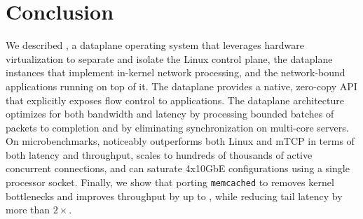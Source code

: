 
\section{Conclusion}

We described \ix, a dataplane operating system that leverages hardware
virtualization to separate and isolate the Linux control plane, the
\ix dataplane instances that implement in-kernel network processing,
and the network-bound applications running on top of it.  The \ix
dataplane provides a native, zero-copy API that explicitly exposes
flow control to applications. The dataplane architecture optimizes for
both bandwidth and latency by processing bounded batches of packets to
completion and by eliminating synchronization on multi-core
servers. On microbenchmarks, \ix noticeably outperforms both Linux and
mTCP in terms of both latency and throughput, scales to hundreds of
thousands of active concurrent connections, and can saturate 4x10GbE
configurations using a single processor socket.  Finally, we show that
porting \texttt{memcached} to \ix removes kernel bottlenecks and
improves throughput by up to \usrspeedup, while reducing tail latency
by more than $2\times$.


